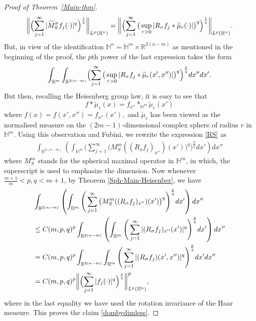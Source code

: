\documentclass[11pt]{amsart}
\newcommand {\R}{\mathbb R}
\newcommand{\Ha}{\mathbb{H}^n}
\theoremstyle{definition}
\numberwithin{equation}{section}
\begin{document}
\begin{proof}[Proof of Theorem~\ref{Main-thm}]
 \begin{align*}  \biggl\|\Bigl(\sum_{j=1}^{\infty}|\widetilde{M}^{\sigma}_{S}f_j(\cdot)|^q\Bigr)^\frac{1}{q}\biggr\|_{L^p(\Ha)} = \biggl\|\Bigl(\sum_{j=1}^{\infty}\big(\sup_{r>0}|R_{\sigma}f_j\ast \widetilde{\mu}_r(\cdot)|\big)^q\Bigr)^\frac{1}{q}\biggr\|_{L^p(\Ha)}.
 \end{align*}
But, in view of the identification $\Ha=\mathbb{H}^{m}\times \R^{2(n-m)}$ as mentioned in the beginning of the proof, the $p$th power of the last expression takes the form 
\begin{align}
\label{RS}
    \int_{\mathbb{H}^{m}} \int_{\R^{2(n-m)}} \Bigl(\sum_{j=1}^{\infty}\big(\sup_{r>0}|R_{\sigma}f_j\ast \widetilde{\mu}_r(x',x'')|\big)^q\Bigr)^\frac{p}{q} dx''dx'.
\end{align}
But then, recalling the Heisenberg group law, it is easy to see that 
$$f\ast \widetilde{\mu}_r(x)= f_{x''}\ast_{\mathbb{H}^{m}}\widetilde{\mu}_r(x')$$
where $f(x)=f(x',x'')=f_{x''}(x'),$ and $\widetilde{\mu}_r$ has been viewed as the normalised measure on the $(2m-1)$-dimensional complex sphere of radius $r$ in $\mathbb{H}^{m}.$ Using this observation and Fubini,  we rewrite the expression \eqref{RS} as 
\begin{align*}
    \int_{\R^{2(n-m)}} \left( \int_{\mathbb{H}^{m}} \Bigg(\sum_{j=1}^\infty \big(M^{m}_S((R_{\sigma}f_j)_{x''})(x')\big)^q\Bigg)^{\frac{p}q}dx'\right)dx''
\end{align*}
where $M^{m}_S$ stands for the spherical maximal operator in $\mathbb{H}^{m}$, in which,  the superscript is used to emphasize the dimension. Now whenever $\frac{m+1}{m}<p,q< {m+1}$, by Theorem \ref{Sph-Main-Heisenber}, we have 
\begin{align*}
    & \int_{\R^{2(n-m)}} \left( \int_{\mathbb{H}^{m}} \Bigg(\sum_{j=1}^\infty \big(M^{m}_S((R_{\sigma}f_j)_{x''})(x')\big)^q\Bigg)^{\frac{p}q}dx'\right)dx''\\
    & \leq C({m,p,q})^p \int_{\R^{2(n-m)}} \left( \int_{\mathbb{H}^{m}} \Bigg(\sum_{j=1}^\infty |(R_{\sigma}f_j)_{x''}(x')|^q\Bigg)^{\frac{p}q}dx'\right)dx''\\
    &= C({m,p,q})^p \int_{\R^{2(n-m)}} \int_{\mathbb{H}^{m}} \Bigg(\sum_{j=1}^\infty |(R_{\sigma}f_j)(x',x'')|^q\Bigg)^{\frac{p}q}dx'dx''\\
    &=C({m,p,q})^p\biggl\|\Bigl(\sum_{j=1}^{\infty}|f_j(\cdot)|^q\Bigr)^\frac{1}{q}\biggr\|^p_{L^p(\Ha)},
\end{align*}
where in the last equality we have used the rotation invariance of the Haar measure. This proves the claim \eqref{dombydimless}.


\end{proof}
\end{document}
